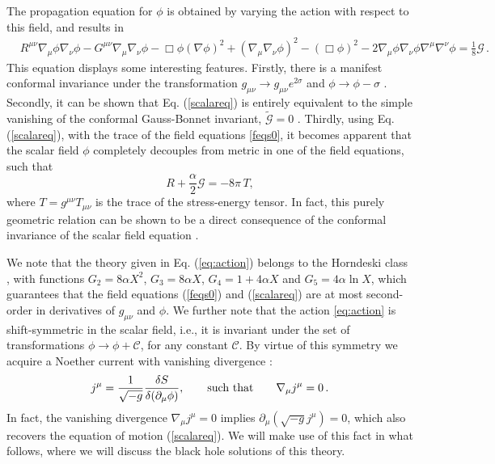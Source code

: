 \documentclass[reprint,amsmath,amssymbGaps,onecolumn,notitlepage,nofootinbib]{revtex4-1}
\newcommand{\dal}{\Box \phi}
\newcommand{\dpp}{\left(\nabla \phi \right)^2}
\begin{document}
The propagation equation for $\phi$ is obtained by varying the action with respect to this field, and results in
\begin{equation} \label{scalareq}
\begin{aligned}
&R^{\mu \nu} \nabla_{\mu} \phi \nabla_{\nu} \phi - G^{\mu \nu}\nabla_\mu \nabla_\nu \phi - \dal \dpp +(\nabla_\mu \nabla_\nu \phi)^2 
- (\dal)^2 - 2\nabla_\mu \phi \nabla_\nu \phi \nabla^\mu \nabla^\nu \phi = \frac{1}{8}\mathcal{G} \, .
\end{aligned}
\end{equation}
This equation displays some interesting features. Firstly, there is a manifest conformal invariance under the transformation $g_{\mu \nu} \to g_{\mu \nu} e^{2\sigma}$ and $\phi \to \phi -\sigma$ \cite{Fernandes:2021dsb}. Secondly, it can be shown that Eq. (\ref{scalareq}) is entirely equivalent to the simple vanishing of the conformal Gauss-Bonnet invariant, $\tilde{\mathcal{G}}=0$ \cite{Fernandes:2020nbq}. Thirdly, using Eq. (\ref{scalareq}), with the trace of the field equations \eqref{feqs0}, it becomes apparent that the scalar field $\phi$ completely decouples from metric in one of the field equations, such that
\begin{equation}
    R+\frac{\alpha}{2}\mathcal{G} = -8\pi \,T,
    \label{Eq:trace}
\end{equation}
where $T=g^{\mu \nu} T_{\mu \nu}$ is the trace of the stress-energy tensor. In fact, this purely geometric relation can be shown to be a direct consequence of the conformal invariance of the scalar field equation \cite{Fernandes:2021dsb}.

We note that the theory given in Eq. (\ref{eq:action}) belongs to the Horndeski class \cite{Horndeski}, with functions $G_2=8 \alpha X^2$, $G_3=8 \alpha X$, $G_4=1+4 \alpha X$ and $G_5 = 4 \alpha \ln X$, which guarantees that the field equations (\ref{feqs0}) and (\ref{scalareq}) are at most second-order in derivatives of $g_{\mu \nu}$ and $\phi$. We further note that the action \eqref{eq:action} is shift-symmetric in the scalar field, i.e., it is invariant under the set of transformations $\phi \to \phi + \mathcal{C}$, for any constant $\mathcal{C}$. By virtue of this symmetry we acquire a Noether current with vanishing divergence \cite{Saravani:2019xwx}:
\begin{equation}
    j^{\mu} = \frac{1}{\sqrt{-g}}\frac{\delta S}{\delta (\partial_\mu \phi)}, \qquad {\rm such\,\, that} \qquad \nabla_\mu j^\mu = 0 \,. \label{eq:current}
\end{equation}
In fact, the vanishing divergence $\nabla_\mu j^\mu = 0$ implies $\partial_\mu \left(\sqrt{-g} j^\mu\right) = 0$, which also recovers the equation of motion (\ref{scalareq}). We will make use of this fact in what follows, where we will discuss the black hole solutions of this theory.
\end{document}
